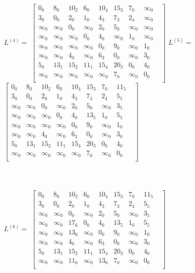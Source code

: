 \documentclass{article}
\begin{document}
$L^{(4)} = $
$\begin{bmatrix}
0_0 & 8_0 & 10_2 & 6_0 & 10_4 & 15_3 & 7_0 & \infty_0 & \\
3_0 & 0_0 & 2_0 & 1_0 & 4_3 & 7_3 & 2_4 & \infty_0 & \\
\infty_0 & \infty_0 & 0_0 & \infty_0 & 2_0 & 5_0 & \infty_0 & \infty_0 & \\
\infty_0 & \infty_0 & \infty_0 & 0_0 & 4_0 & \infty_0 & 1_0 & \infty_0 & \\
\infty_0 & \infty_0 & \infty_0 & \infty_0 & 0_0 & 9_0 & \infty_0 & 1_0 & \\
\infty_0 & \infty_0 & 4_0 & \infty_0 & 6_3 & 0_0 & \infty_0 & 3_0 & \\
5_0 & 13_1 & 15_2 & 11_1 & 15_4 & 20_3 & 0_0 & 4_0 & \\
\infty_0 & \infty_0 & \infty_0 & \infty_0 & \infty_0 & 7_0 & \infty_0 & 0_0 & \\
\end{bmatrix}$
$L^{(5)} = $
$\begin{bmatrix}
0_0 & 8_0 & 10_2 & 6_0 & 10_4 & 15_3 & 7_0 & 11_5 & \\
3_0 & 0_0 & 2_0 & 1_0 & 4_3 & 7_3 & 2_4 & 5_5 & \\
\infty_0 & \infty_0 & 0_0 & \infty_0 & 2_0 & 5_0 & \infty_0 & 3_5 & \\
\infty_0 & \infty_0 & \infty_0 & 0_0 & 4_0 & 13_5 & 1_0 & 5_5 & \\
\infty_0 & \infty_0 & \infty_0 & \infty_0 & 0_0 & 9_0 & \infty_0 & 1_0 & \\
\infty_0 & \infty_0 & 4_0 & \infty_0 & 6_3 & 0_0 & \infty_0 & 3_0 & \\
5_0 & 13_1 & 15_2 & 11_1 & 15_4 & 20_3 & 0_0 & 4_0 & \\
\infty_0 & \infty_0 & \infty_0 & \infty_0 & \infty_0 & 7_0 & \infty_0 & 0_0 & \\
\end{bmatrix}$\\\\\\\\
$L^{(6)} = $
$\begin{bmatrix}
0_0 & 8_0 & 10_2 & 6_0 & 10_4 & 15_3 & 7_0 & 11_5 & \\
3_0 & 0_0 & 2_0 & 1_0 & 4_3 & 7_3 & 2_4 & 5_5 & \\
\infty_0 & \infty_0 & 0_0 & \infty_0 & 2_0 & 5_0 & \infty_0 & 3_5 & \\
\infty_0 & \infty_0 & 17_6 & 0_0 & 4_0 & 13_5 & 1_0 & 5_5 & \\
\infty_0 & \infty_0 & 13_6 & \infty_0 & 0_0 & 9_0 & \infty_0 & 1_0 & \\
\infty_0 & \infty_0 & 4_0 & \infty_0 & 6_3 & 0_0 & \infty_0 & 3_0 & \\
5_0 & 13_1 & 15_2 & 11_1 & 15_4 & 20_3 & 0_0 & 4_0 & \\
\infty_0 & \infty_0 & 11_6 & \infty_0 & 13_6 & 7_0 & \infty_0 & 0_0 & \\
\end{bmatrix}$
\end{document}
